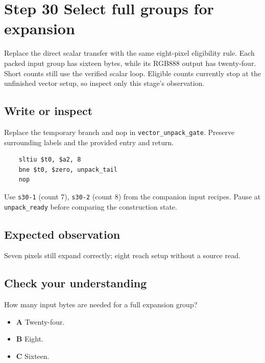 \section{Step 30 Select full groups for expansion}\label{rgb-s30}

Replace the direct scalar transfer with the same eight-pixel eligibility rule. Each packed input group has sixteen bytes, while its RGB888 output has twenty-four. Short counts still use the verified scalar loop. Eligible counts currently stop at the unfinished vector setup, so inspect only this stage's observation.

\subsection{Write or inspect}
Replace the temporary branch and nop in \texttt{vector\_unpack\_gate}. Preserve surrounding labels and the provided entry and return.

\begin{verbatim}
    sltiu $t0, $a2, 8
    bne $t0, $zero, unpack_tail
    nop
\end{verbatim}
Use \texttt{s30-1} (count 7), \texttt{s30-2} (count 8) from the companion input recipes. Pause at \texttt{unpack\_ready} before comparing the construction state.

\subsection{Expected observation}
Seven pixels still expand correctly; eight reach setup without a source read.

\subsection{Check your understanding}
How many input bytes are needed for a full expansion group?

\begin{itemize}
  \item \textbf{A} Twenty-four.
  \item \textbf{B} Eight.
  \item \textbf{C} Sixteen.
\end{itemize}
